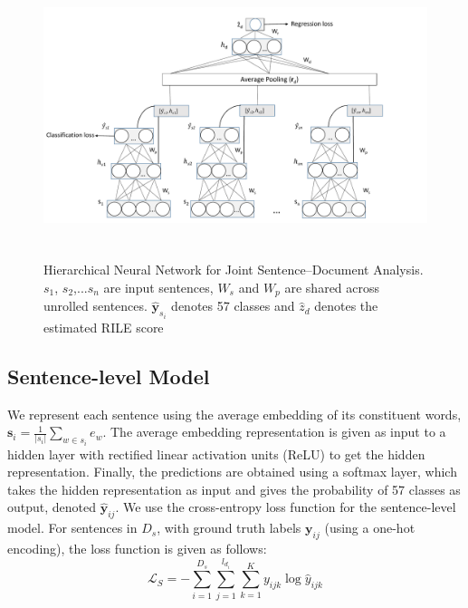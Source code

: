 \documentclass[11pt,a4paper]{article}
\begin{document}
\begin{figure}[!t]
\centering
\includegraphics[height=8.3cm, scale=1.4]{ALTA_Model_New.pdf}
\caption{Hierarchical Neural Network for Joint Sentence--Document Analysis. $s_{1}$, $s_{2}$,...$s_{n}$ are input sentences, $W_{s}$ and $W_{p}$ are shared across unrolled sentences. $\hat{\mathbf{y}}_{s_{i}}$ denotes  57 classes and $\hat{z}_{d}$ denotes the estimated RILE score}
 \label{fig:HNN}
 \end{figure}

\subsection{Sentence-level Model}
We represent each sentence using the average embedding of its constituent words, $ \bm{s}_{i} = \frac{1}{|s_{i}|}\sum_{w \in s_{i}} e_{w}$.
The average embedding representation is given as input to a hidden layer with rectified linear activation units (ReLU) to get the hidden representation. Finally, the predictions are obtained using a softmax layer, which takes the hidden representation as input and gives the probability of 57 classes as output, denoted $\hat{\mathbf{y}}_{ij}$.
We use the cross-entropy loss function for the sentence-level model. For sentences in $D_{s}$, with ground truth labels $\mathbf{y}_{ij}$ (using a one-hot encoding), the loss function is given as follows:
  \begin{equation}
    \label{eq:sent-loss}
    \mathcal{L}_{S} = 
    -\sum_{i=1}^{D_{s}}\sum_{j=1}^{l_{d_{i}}}\sum_{k=1}^{K} y_{{ijk}} \log \hat{y}_{{ijk}}  
  \end{equation}
\end{document}
